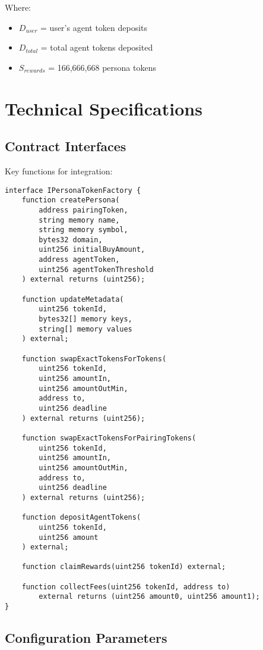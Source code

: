 \documentclass{article}
\begin{document}
\begin{appendices}
Where:
\begin{itemize}
    \item $D_{user}$ = user's agent token deposits
    \item $D_{total}$ = total agent tokens deposited
    \item $S_{rewards}$ = 166,666,668 persona tokens
\end{itemize}

\section{Technical Specifications}

\subsection{Contract Interfaces}

Key functions for integration:

\begin{verbatim}
interface IPersonaTokenFactory {
    function createPersona(
        address pairingToken,
        string memory name,
        string memory symbol,
        bytes32 domain,
        uint256 initialBuyAmount,
        address agentToken,
        uint256 agentTokenThreshold
    ) external returns (uint256);

    function updateMetadata(
        uint256 tokenId,
        bytes32[] memory keys,
        string[] memory values
    ) external;

    function swapExactTokensForTokens(
        uint256 tokenId,
        uint256 amountIn,
        uint256 amountOutMin,
        address to,
        uint256 deadline
    ) external returns (uint256);

    function swapExactTokensForPairingTokens(
        uint256 tokenId,
        uint256 amountIn,
        uint256 amountOutMin,
        address to,
        uint256 deadline
    ) external returns (uint256);

    function depositAgentTokens(
        uint256 tokenId,
        uint256 amount
    ) external;

    function claimRewards(uint256 tokenId) external;

    function collectFees(uint256 tokenId, address to)
        external returns (uint256 amount0, uint256 amount1);
}
\end{verbatim}

\subsection{Configuration Parameters}


\end{appendices}
\end{document}
